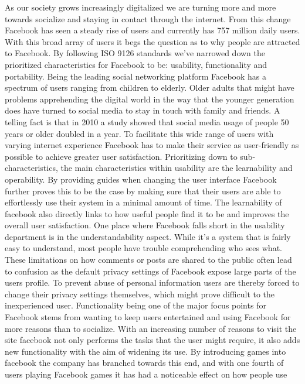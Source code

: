 \documentclass[conference]{IEEEtran}
\begin{document}
As our society grows increasingly digitalized we are turning more and more
towards socialize and staying in contact through the internet. From this change
Facebook has seen a steady rise of users and currently has 757 million daily
users. With this broad array of users it begs the question as to why people are
attracted to Facebook. By following ISO 9126 standards we’ve narrowed down the
prioritized characteristics for Facebook to be: usability, functionality and
portability.  Being the leading social networking platform Facebook has a
spectrum of users ranging from children to elderly. Older adults that might
have problems apprehending the digital world in the way that the younger
generation does have turned to social media to stay in touch with family and
friends. A telling fact is that in 2010 a study showed that social media usage
of people 50 years or older doubled in a year. To facilitate this wide range of
users with varying internet experience Facebook has to make their service as
user-friendly as possible to achieve greater user satisfaction. Prioritizing
down to sub-characteristics, the main characteristics within usability are the
learnability and operability. By providing guides when changing the user
interface Facebook further proves this to be the case by making sure that their
users are able to effortlessly use their system in a minimal amount of time.
The learnability of facebook also directly links to how useful people find it
to be and improves the overall user satisfaction.  One place where Facebook
falls short in the usability department is in the understandability aspect.
While it’s a system that is fairly easy to understand, most people have trouble
comprehending who sees what. These limitations on how comments or posts are
shared to the public often lead to confusion as the default privacy settings of
Facebook expose large parts of the users profile. To prevent abuse of personal
information users are thereby forced to change their privacy settings
themselves, which might prove difficult to the inexperienced user.
Functionality being one of the major focus points for Facebook stems from
wanting to keep users entertained and using Facebook for more reasons than to
socialize. With an increasing number of reasons to visit the site facebook not
only performs the tasks that the user might require, it also adds new
functionality with the aim of widening its use. By introducing games into
facebook the company has branched towards this end, and with one fourth of
users playing Facebook games it has had a noticeable effect on how people use
\end{document}

